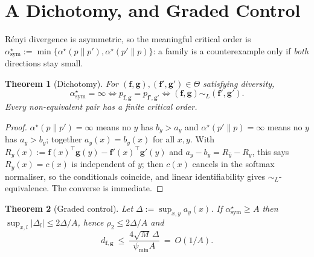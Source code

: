 \documentclass[10pt,letterpaper,twocolumn]{article}
\newcommand{\DONE}[1]{}
\newcommand{\bff}{\mathbf{f}}
\newcommand{\bfg}{\mathbf{g}}
\newcommand{\dfg}{d_{\bff,\bfg}}
\newcommand{\simL}{\sim_{L}}
\theoremstyle{plain}
\newtheorem{theorem}{Theorem}
\theoremstyle{definition}
\theoremstyle{remark}
\begin{document}
\section{A Dichotomy, and Graded Control}
\label{sec:dichotomy}

R\'enyi divergence is asymmetric, so the meaningful critical order is
$\alpha^{\star}_{\mathrm{sym}}:=\min\{\alpha^{\star}(p\|p'),
\alpha^{\star}(p'\|p)\}$: a family is a counterexample only if \emph{both}
directions stay small.

\begin{theorem}[Dichotomy]
\label{thm:dichotomy}
For $(\bff,\bfg),(\bff',\bfg')\in\Theta$ satisfying diversity,
\begin{equation}
\alpha^{\star}_{\mathrm{sym}}=\infty
\iff p_{\bff,\bfg}=p_{\bff',\bfg'}
\iff (\bff,\bfg)\simL(\bff',\bfg').
\end{equation}
Every non-equivalent pair has a \emph{finite} critical order.
\end{theorem}

\begin{proof}
$\alpha^{\star}(p\|p')=\infty$ means no $y$ has $b_{y}>a_{y}$ and
$\alpha^{\star}(p'\|p)=\infty$ means no $y$ has $a_{y}>b_{y}$; together
$a_{y}(x)=b_{y}(x)$ for all $x,y$. With
$R_{y}(x):=\bff(x)^{\top}\bfg(y)-\bff'(x)^{\top}\bfg'(y)$ and
$a_{y}-b_{y}=R_{\hat y}-R_{y}$, this says $R_{y}(x)=c(x)$ is independent of
$y$; then $c(x)$ cancels in the softmax normaliser, so the conditionals
coincide, and linear identifiability gives $\simL$-equivalence. The converse is
immediate.
\end{proof}

\DONE{Regression test over $329$ pairs. The residual $\dfg$ in the
$\alpha^{\star}_{\mathrm{sym}}=\infty$ class decays as $O(1/n)$ in the sample
size ($2.0\!\times\!10^{-3}$ at $n{=}500$ down to $6.3\!\times\!10^{-5}$ at
$n{=}16000$), the finite-sample bias of the cross-covariance estimator, against
$\min|\dfg|=6.5\times10^{-2}$ in the finite class. The CI tolerance is therefore
$5/n$, not a fixed constant.}

\begin{theorem}[Graded control]
\label{thm:graded}
Let $\Delta:=\sup_{x,y}a_{y}(x)$. If $\alpha^{\star}_{\mathrm{sym}}\ge A$ then
$\sup_{x,l}|\Delta_{l}|\le2\Delta/A$, hence $\rho_{2}\le2\Delta/A$ and
\begin{equation}
\dfg\ \le\ \frac{4\sqrt{M}\,\Delta}{\psi_{\min}A}\ =\ O(1/A).
\label{eq:graded}
\end{equation}
\end{theorem}
\end{document}
